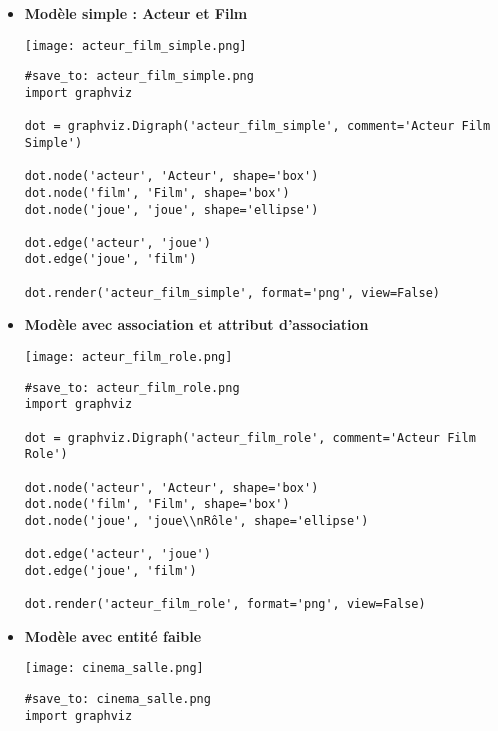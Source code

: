 \documentclass{article}
\begin{document}
\begin{itemize}
    \item \textbf{Modèle simple : Acteur et Film}
    \begin{center}
        \texttt{[image: acteur\_film\_simple.png]}
        \label{fig:acteur_film_simple}
    \end{center}
    \begin{verbatim}
#save_to: acteur_film_simple.png
import graphviz

dot = graphviz.Digraph('acteur_film_simple', comment='Acteur Film Simple')

dot.node('acteur', 'Acteur', shape='box')
dot.node('film', 'Film', shape='box')
dot.node('joue', 'joue', shape='ellipse')

dot.edge('acteur', 'joue')
dot.edge('joue', 'film')

dot.render('acteur_film_simple', format='png', view=False)
    \end{verbatim}

    \item \textbf{Modèle avec association et attribut d'association}
    \begin{center}
        \texttt{[image: acteur\_film\_role.png]}
        \label{fig:acteur_film_role}
    \end{center}
    \begin{verbatim}
#save_to: acteur_film_role.png
import graphviz

dot = graphviz.Digraph('acteur_film_role', comment='Acteur Film Role')

dot.node('acteur', 'Acteur', shape='box')
dot.node('film', 'Film', shape='box')
dot.node('joue', 'joue\\nRôle', shape='ellipse')

dot.edge('acteur', 'joue')
dot.edge('joue', 'film')

dot.render('acteur_film_role', format='png', view=False)
    \end{verbatim}


    \item \textbf{Modèle avec entité faible}
     \begin{center}
        \texttt{[image: cinema\_salle.png]}
        \label{fig:cinema_salle}
    \end{center}
    \begin{verbatim}
#save_to: cinema_salle.png
import graphviz


\end{verbatim}
\end{itemize}
\end{document}
